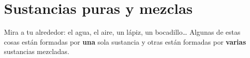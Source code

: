 %
%
%
%

\raggedbottom %

\section{Sustancias puras y mezclas}

Mira a tu alrededor: el agua, el aire, un lápiz, un bocadillo\ldots{} Algunas de estas cosas están formadas por \textbf{una} sola sustancia y otras están formadas por \textbf{varias} sustancias mezcladas.


